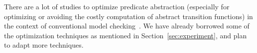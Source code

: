 There are a lot of studies to optimize predicate abstraction (especially 
for optimizing or avoiding the costly computation of abstract transition 
functions) in the context of conventional model 
checking~\cite{Ball2001,McMillan2005}. We have already borrowed some of 
the optimization techniques as mentioned in Section~\ref{sec:experiment}, 
and plan to adapt more techniques.


%




